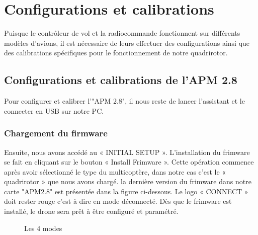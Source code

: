 	
	\section{Configurations et calibrations}
	Puisque le contrôleur de vol et la radiocommande fonctionnent sur différents modèles d'avions, il est nécessaire de leurs effectuer des configurations  ainsi que  des calibrations spécifiques pour le fonctionnement de notre quadrirotor. 
	\subsection{Configurations et calibrations de l'APM 2.8}
	Pour configurer et calibrer l'"APM 2.8", il nous reste  de lancer l'assistant et le connecter en USB sur notre PC.
	\subsubsection{Chargement du firmware }
	Ensuite, nous avons accédé au « INITIAL SETUP ». L'installation du frimware se fait en cliquant sur le bouton « Install Frimware ». Cette opération commence après avoir sélectionné le type du multicoptère, dans notre cas c'est le « quadrirotor » que nous avons chargé.  la dernière version du frimware dans
	notre carte "APM2.8" est présentée dans la figure ci-dessous. Le logo « CONNECT » doit rester rouge c'est à dire en mode déconnecté. Dès que le frimware est installé, le drone sera prêt à être configuré et paramétré.
	\begin{figure}[H]
		\begin{center}
			\centering
		\end{center}
		\caption{Les 4 modes}
	\end{figure}
	
